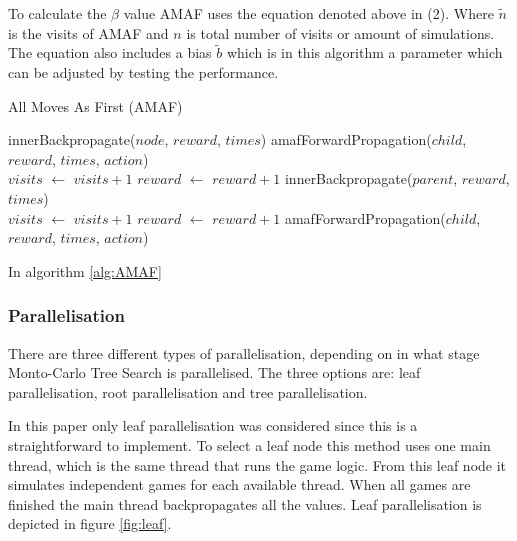 \documentclass{ba-kecs}
\begin{document}
To calculate the $\beta$ value AMAF uses the equation denoted above in (2). Where $\tilde{n}$ is the visits of AMAF and $n$ is total number of visits or amount of simulations. The equation also includes a bias $\tilde{b}$ which is in this algorithm a parameter which can be adjusted by testing the performance. \cite{gelly2011monte}

\begin{algorithm}
	\caption{All Moves As First (AMAF)}
	\label{alg:AMAF}
	\begin{algorithmic}
		\State innerBackpropagate($node$, $reward$, $times$)
		\State amafForwardPropagation($child$, $reward$, $times$, $action$)
		\EndFor\label{}
		\EndFunction \\
		
		\State $visits$ $\leftarrow$ $visits + 1$
		\State $reward$ $\leftarrow$ $reward + 1$
			\State innerBackpropagate($parent$, $reward$, $times$)
		\EndIf
		\EndFunction \\
		
			\State $visits$ $\leftarrow$ $visits + 1$
			\State $reward$ $\leftarrow$ $reward + 1$
		\Else
				\State amafForwardPropagation($child$, $reward$, $times$, $action$)
			\EndFor
		\EndIf
		\EndFunction
	\end{algorithmic}
\end{algorithm}

In algorithm \ref{alg:AMAF}




\subsubsection{Parallelisation}
There are three different types of parallelisation, depending on in what stage Monto-Carlo Tree Search is parallelised. The three options are: leaf parallelisation, root parallelisation and tree parallelisation. 

In this paper only  leaf parallelisation was considered since this is a straightforward to implement. To select a leaf node this method uses one main thread, which is the same thread that runs the game logic. From this leaf node it simulates independent games for each available thread. When all games are finished the main thread backpropagates all the values.\cite{chaslot2008parallel} Leaf parallelisation is depicted in figure \ref{fig:leaf}.
\end{document}
